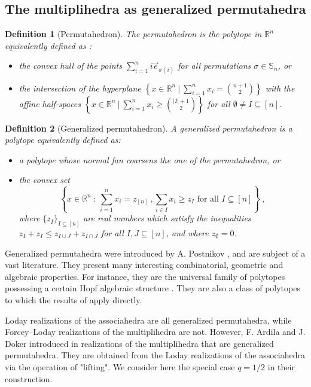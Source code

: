 \documentclass[twoside, 12pt]{amsart}
\newtheorem{definition}{Definition}[section]
\theoremstyle{remark}
\newcommand{\RR}{\mathbb{R}}
\begin{document}

\subsection{The multiplihedra as generalized permutahedra} 
\label{sec:generalizedpermutahedra}

\begin{definition}[Permutahedron] The \emph{permutahedron} is the polytope in $\RR^n$ equivalently defined as :
\begin{itemize}
  \item the convex hull of the points $\displaystyle \sum_{i=1}^{n}i\vec e_{\sigma(i)}$ for all permutations $\sigma \in \mathbb{S}_n$, or
  \item the intersection of the hyperplane $\displaystyle  \left\{x \in \RR^n \ \bigg| \ \sum_{i=1}^{n} x_i = \binom{n+1}{2}\right\}$ with the affine half-spaces $\displaystyle \left\{x \in \RR^n \ \bigg| \ \sum_{i=1}^{n} x_i \geq \binom{|I|+1}{2}\right\}$ for all $\emptyset\neq I \subseteq [n]$.
\end{itemize}
\end{definition}

\begin{definition}[Generalized permutahedron]
A \emph{generalized permutahedron} is a polytope equivalently defined as:
\begin{itemize}
\item a polytope whose normal fan coarsens the one of the permutahedron, or 
\item the convex set \[ \left\{ x \in \RR^n \ : \ \sum_{i=1}^{n}x_i = z_{[n]} \ , \sum_{i \in I} x_i \geq z_I \text{ for all } I \subseteq [n] \right\} \ , \]
where $\{ z_I \}_{I \subseteq [n]}$ are real numbers which satisfy the inequalities $z_I+z_I \leq z_{I\cup J} + z_{I \cap J}$ for all $I,J \subseteq [n]$, and where $z_\emptyset =0$.
\end{itemize}
\end{definition}

Generalized permutahedra were introduced by A. Postnikov \cite{Postnikov09}, and are subject of a vast literature. 
They present many interesting combinatorial, geometric and algebraic properties. 
For instance, they are the universal family of polytopes possessing a certain Hopf algebraic structure \cite{AguiarArdila17}. 
They are also a class of polytopes to which the results of \cite{LA21} apply directly. 

Loday realizations of the associahedra are all generalized permutahedra, while Forcey--Loday realizations of the multiplihedra are not. 
However, F. Ardila and J. Doker introduced in \cite{AD13} realizations of the multiplihedra that are generalized permutahedra. 
They are obtained from the Loday realizations of the associahedra via the operation of "lifting". 
We consider here the special case $q=1/2$ in their construction.
\end{document}
